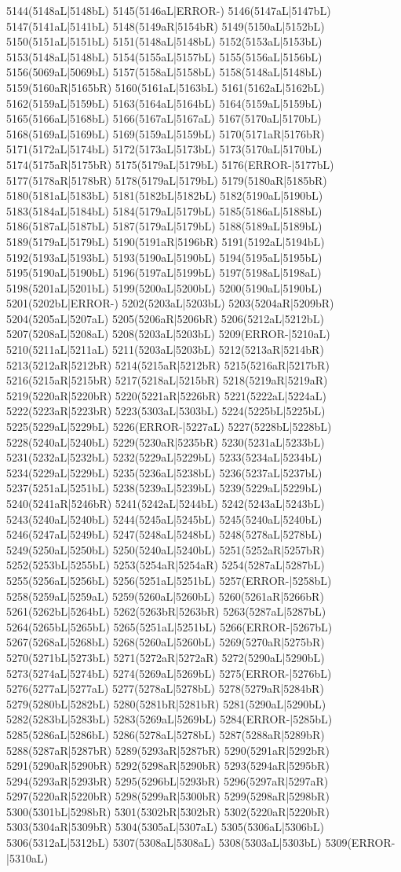 5144(5148aL|5148bL) 5145(5146aL|ERROR-) 5146(5147aL|5147bL) 5147(5141aL|5141bL) 5148(5149aR|5154bR) 5149(5150aL|5152bL) 5150(5151aL|5151bL) 5151(5148aL|5148bL) 5152(5153aL|5153bL) 5153(5148aL|5148bL) 5154(5155aL|5157bL) 5155(5156aL|5156bL) 5156(5069aL|5069bL) 5157(5158aL|5158bL) 5158(5148aL|5148bL) 5159(5160aR|5165bR) 5160(5161aL|5163bL) 5161(5162aL|5162bL) 5162(5159aL|5159bL) 5163(5164aL|5164bL) 5164(5159aL|5159bL) 5165(5166aL|5168bL) 5166(5167aL|5167aL) 5167(5170aL|5170bL) 5168(5169aL|5169bL) 5169(5159aL|5159bL) 5170(5171aR|5176bR) 5171(5172aL|5174bL) 5172(5173aL|5173bL) 5173(5170aL|5170bL) 5174(5175aR|5175bR) 5175(5179aL|5179bL) 5176(ERROR-|5177bL) 5177(5178aR|5178bR) 5178(5179aL|5179bL) 5179(5180aR|5185bR) 5180(5181aL|5183bL) 5181(5182bL|5182bL) 5182(5190aL|5190bL) 5183(5184aL|5184bL) 5184(5179aL|5179bL) 5185(5186aL|5188bL) 5186(5187aL|5187bL) 5187(5179aL|5179bL) 5188(5189aL|5189bL) 5189(5179aL|5179bL) 5190(5191aR|5196bR) 5191(5192aL|5194bL) 5192(5193aL|5193bL) 5193(5190aL|5190bL) 5194(5195aL|5195bL) 5195(5190aL|5190bL) 5196(5197aL|5199bL) 5197(5198aL|5198aL) 5198(5201aL|5201bL) 5199(5200aL|5200bL) 5200(5190aL|5190bL) 5201(5202bL|ERROR-) 5202(5203aL|5203bL) 5203(5204aR|5209bR) 5204(5205aL|5207aL) 5205(5206aR|5206bR) 5206(5212aL|5212bL) 5207(5208aL|5208aL) 5208(5203aL|5203bL) 5209(ERROR-|5210aL) 5210(5211aL|5211aL) 5211(5203aL|5203bL) 5212(5213aR|5214bR) 5213(5212aR|5212bR) 5214(5215aR|5212bR) 5215(5216aR|5217bR) 5216(5215aR|5215bR) 5217(5218aL|5215bR) 5218(5219aR|5219aR) 5219(5220aR|5220bR) 5220(5221aR|5226bR) 5221(5222aL|5224aL) 5222(5223aR|5223bR) 5223(5303aL|5303bL) 5224(5225bL|5225bL) 5225(5229aL|5229bL) 5226(ERROR-|5227aL) 5227(5228bL|5228bL) 5228(5240aL|5240bL) 5229(5230aR|5235bR) 5230(5231aL|5233bL) 5231(5232aL|5232bL) 5232(5229aL|5229bL) 5233(5234aL|5234bL) 5234(5229aL|5229bL) 5235(5236aL|5238bL) 5236(5237aL|5237bL) 5237(5251aL|5251bL) 5238(5239aL|5239bL) 5239(5229aL|5229bL) 5240(5241aR|5246bR) 5241(5242aL|5244bL) 5242(5243aL|5243bL) 5243(5240aL|5240bL) 5244(5245aL|5245bL) 5245(5240aL|5240bL) 5246(5247aL|5249bL) 5247(5248aL|5248bL) 5248(5278aL|5278bL) 5249(5250aL|5250bL) 5250(5240aL|5240bL) 5251(5252aR|5257bR) 5252(5253bL|5255bL) 5253(5254aR|5254aR) 5254(5287aL|5287bL) 5255(5256aL|5256bL) 5256(5251aL|5251bL) 5257(ERROR-|5258bL) 5258(5259aL|5259aL) 5259(5260aL|5260bL) 5260(5261aR|5266bR) 5261(5262bL|5264bL) 5262(5263bR|5263bR) 5263(5287aL|5287bL) 5264(5265bL|5265bL) 5265(5251aL|5251bL) 5266(ERROR-|5267bL) 5267(5268aL|5268bL) 5268(5260aL|5260bL) 5269(5270aR|5275bR) 5270(5271bL|5273bL) 5271(5272aR|5272aR) 5272(5290aL|5290bL) 5273(5274aL|5274bL) 5274(5269aL|5269bL) 5275(ERROR-|5276bL) 5276(5277aL|5277aL) 5277(5278aL|5278bL) 5278(5279aR|5284bR) 5279(5280bL|5282bL) 5280(5281bR|5281bR) 5281(5290aL|5290bL) 5282(5283bL|5283bL) 5283(5269aL|5269bL) 5284(ERROR-|5285bL) 5285(5286aL|5286bL) 5286(5278aL|5278bL) 5287(5288aR|5289bR) 5288(5287aR|5287bR) 5289(5293aR|5287bR) 5290(5291aR|5292bR) 5291(5290aR|5290bR) 5292(5298aR|5290bR) 5293(5294aR|5295bR) 5294(5293aR|5293bR) 5295(5296bL|5293bR) 5296(5297aR|5297aR) 5297(5220aR|5220bR) 5298(5299aR|5300bR) 5299(5298aR|5298bR) 5300(5301bL|5298bR) 5301(5302bR|5302bR) 5302(5220aR|5220bR) 5303(5304aR|5309bR) 5304(5305aL|5307aL) 5305(5306aL|5306bL) 5306(5312aL|5312bL) 5307(5308aL|5308aL) 5308(5303aL|5303bL) 5309(ERROR-|5310aL) 